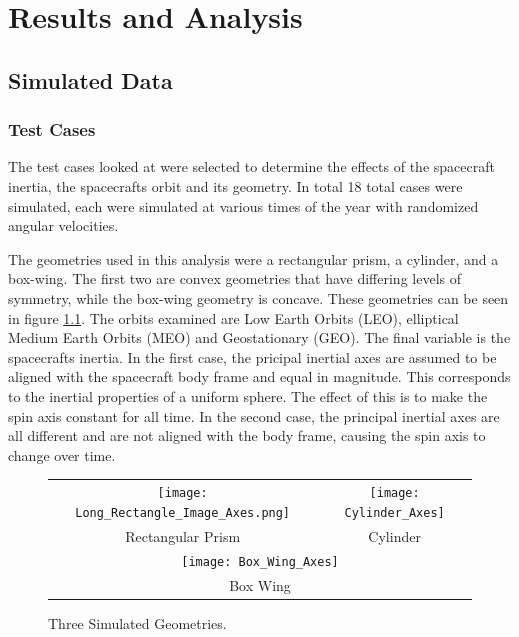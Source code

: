 \chapter{Results and Analysis}

\section{Simulated Data}

\subsection{Test Cases}

The test cases looked at were selected to determine the effects of the spacecraft inertia, the spacecrafts orbit and its geometry. In total 18 total cases were simulated, each were simulated at various times of the year with randomized angular velocities.

The geometries used in this analysis were a rectangular prism, a cylinder, and a box-wing. The first two are convex geometries that have differing levels of symmetry, while the box-wing geometry is concave. These geometries can be seen in figure \ref{simulated_geometries}. The orbits examined are Low Earth Orbits (LEO), elliptical Medium Earth Orbits (MEO) and Geostationary (GEO). The final variable is the spacecrafts inertia. In the first case, the pricipal inertial axes are assumed to be aligned with the spacecraft body frame and equal in magnitude. This corresponds to the inertial properties of a uniform sphere. The effect of this is to make the spin axis constant for all time. In the second case, the principal inertial axes are all different and are not aligned with the body frame, causing the spin axis to change over time.

\begin{figure}
	\begin{center}
	\begin{tabular}{cc}
		\texttt{[image: Long\_Rectangle\_Image\_Axes.png]} &
		\texttt{[image: Cylinder\_Axes]} \\
		Rectangular Prism & Cylinder \\
		\multicolumn{2}{c}{\texttt{[image: Box\_Wing\_Axes]}} \\
		\multicolumn{2}{c}{Box Wing}
	\end{tabular}
	\end{center}
	\caption{Three Simulated Geometries.}
	\label{simulated_geometries}
\end{figure}


